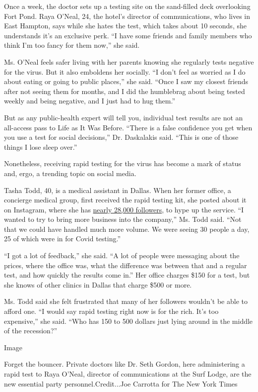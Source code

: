 Once a week, the doctor sets up a testing site on the sand-filled deck
overlooking Fort Pond. Raya O'Neal, 24, the hotel's director of
communications, who lives in East Hampton, says while she hates the
test, which takes about 10 seconds, she understands it's an exclusive
perk. ``I have some friends and family members who think I'm too fancy
for them now,'' she said.

Ms. O'Neal feels safer living with her parents knowing she regularly
tests negative for the virus. But it also emboldens her socially. ``I
don't feel as worried as I do about eating or going to public places,''
she said. ``Once I saw my closest friends after not seeing them for
months, and I did the humblebrag about being tested weekly and being
negative, and I just had to hug them.''

But as any public-health expert will tell you, individual test results
are not an all-access pass to Life as It Was Before. ``There is a false
confidence you get when you use a test for social decisions,'' Dr.
Daskalakis said. ``This is one of those things I lose sleep over.''

Nonetheless, receiving rapid testing for the virus has become a mark of
status and, ergo, a trending topic on social media.

Tasha Todd, 40, is a medical assistant in Dallas. When her former
office, a concierge medical group, first received the rapid testing kit,
she posted about it on Instagram, where she has
\href{https://www.instagram.com/fit.tash36/}{nearly 28,000 followers},
to hype up the service. ``I wanted to try to bring more business into
the company,'' Ms. Todd said. ``Not that we could have handled much more
volume. We were seeing 30 people a day, 25 of which were in for Covid
testing.''

``I got a lot of feedback,'' she said. ``A lot of people were messaging
about the prices, where the office was, what the difference was between
that and a regular test, and how quickly the results come in.'' Her
office charges \$150 for a test, but she knows of other clinics in
Dallas that charge \$500 or more.

Ms. Todd said she felt frustrated that many of her followers wouldn't be
able to afford one. ``I would say rapid testing right now is for the
rich. It's too expensive,'' she said. ``Who has 150 to 500 dollars just
lying around in the middle of the recession?''

Image

Forget the bouncer. Private doctors like Dr. Seth Gordon, here
administering a rapid test to Raya O'Neal, director of communications at
the Surf Lodge, are the new essential party personnel.Credit...Joe
Carrotta for The New York Times


